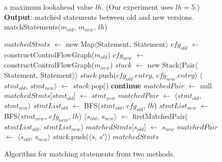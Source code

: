 \begin{figure}[t]
\quad a maximum lookahead value $\mathit{lh}$. (Our experiment uses $\mathit{lh}=5$.)\\
\textbf{Output}: matched statements between old and new versions.
\vspace{-4mm}%
matchStatements($\mathit{m_{old}}$, $\mathit{m_{new}}$, $\mathit{lh}$)\\
\begin{algorithmic}[1]
\STATE $\mathit{matchedStmts}$ $\leftarrow$ new Map$\langle$Statement, Statement$\rangle$
\STATE $\mathit{cfg_{old}}$ $\leftarrow$ constructControlFlowGraph($\mathit{m_{old}}$)
\STATE $\mathit{cfg_{new}}$ $\leftarrow$ constructControlFlowGraph($\mathit{m_{new}}$)
\STATE $\mathit{stack}$ $\leftarrow$ new Stack$\langle$Pair$\langle$Statement, Statement$\rangle$$\rangle$
\STATE $\mathit{stack}$.push($\mathit{cfg_{old}}$.$\mathit{entry}$, $\mathit{cfg_{new}}$.$\mathit{entry}$)
\STATE $\langle$$\mathit{stmt_{old}}$, $\mathit{stmt_{new}}$$\rangle$ $\leftarrow$ $\mathit{stack}$.pop()
\STATE \textbf{continue}
\ENDIF
\STATE $\mathit{matchedPair}$ $\leftarrow$ null
\STATE $\mathit{matchedStmts}$[$\mathit{stmt_{old}}$] $\leftarrow$ $\mathit{stmt_{new}}$
\STATE $\mathit{matchedPair}$ $\leftarrow$ $\langle$$\mathit{stmt_{old}}$, $\mathit{stmt_{new}}$$\rangle$
\ELSE
\STATE $\mathit{stmtList_{old}}$ $\leftarrow$ BFS($\mathit{stmt_{old}}$, $\mathit{cfg_{old}}$, $\mathit{lh}$)
\STATE $\mathit{stmtList_{new}}$ $\leftarrow$ BFS($\mathit{stmt_{new}}$, $\mathit{cfg_{new}}$, $\mathit{lh}$)
\STATE $\langle$$\mathit{s_{old}}$, $\mathit{s_{new}}$$\rangle$ $\leftarrow$ firstMatchedPair($\mathit{stmtList_{old}}$, $\mathit{stmtList_{new}}$)
\STATE $\mathit{matchedStmts}$[$\mathit{s_{old}}$] $\leftarrow$ $\mathit{s_{new}}$
\STATE $\mathit{matchedPair}$ $\leftarrow$ $\langle$$\mathit{s_{old}}$, $\mathit{s_{new}}$$\rangle$
\ENDIF
\ENDIF
{}
\STATE $\mathit{stack}$.push($\langle$$\mathit{s}$, $\mathit{s'}$$\rangle$)
\ENDFOR
\ENDFOR
\ENDIF
\ENDWHILE
\RETURN $\mathit{matchedStmts}$
\end{algorithmic}
\vspace{-2mm}
\caption{Algorithm for matching statements from two methods.
\label{fig:matching}
}
\end{figure}
